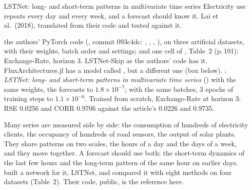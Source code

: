
\renewcommand{\nmdate}{15 October 2026}



  {LSTNet: long- and short-term patterns in multivariate time series}
  {Electricity use repeats every day and every week, and a forecast should know it. Lai et al.\ (2018), translated from
   their code and tested against it.}

\factsheet
  {the authors' PyTorch code (, commit 093c4dc: , , ,
   ), on three artificial datasets, with their weights, batch order and settings; and one cell of
   , Table~2 (p.\,101): Exchange-Rate, horizon 3.}
  {LSTNet-Skip as the authors' code has it. FluxArchitectures.jl has a model called , but a different one
   (box below).}
  {: \emph{LSTNet: long- and short-term patterns in
   multivariate time series} ()}
  {with the same weights, the forecasts to $1.8\times10^{-7}$; with the same batches, 3 epochs of training steps to
   $1.1\times10^{-6}$. Trained from scratch, Exchange-Rate at horizon 3: RSE 0.0256 and CORR 0.9706 against the
   article's 0.0226 and 0.9735.}

Many series are measured side by side: the consumption of hundreds of electricity clients, the occupancy of hundreds of
road sensors, the output of solar plants. They share patterns on two scales, the hours of a day and the days of a week,
and they move together. A forecast should use both: the short-term dynamics of the last few hours and the long-term
pattern of the same hour on earlier days.  built a network for it, LSTNet, and
compared it with eight methods on four datasets (Table~2). Their code, public, is the reference here.

